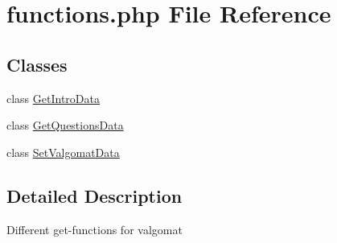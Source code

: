 \hypertarget{functions_8php}{}\section{functions.\+php File Reference}
\label{functions_8php}
\subsection*{Classes}
\begin{DoxyCompactItemize}
\item 
class \hyperlink{class_get_intro_data}{Get\+Intro\+Data}
\item 
class \hyperlink{class_get_questions_data}{Get\+Questions\+Data}
\item 
class \hyperlink{class_set_valgomat_data}{Set\+Valgomat\+Data}
\end{DoxyCompactItemize}


\subsection{Detailed Description}
Different get-\/functions for valgomat 